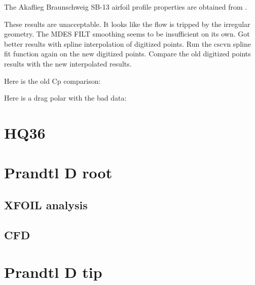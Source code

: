 \documentclass{article}
\begin{document}

The Akaflieg Braunschweig SB-13 airfoil profile properties are obtained from \cite{SB13Aerodynamics}.


These results are unacceptable.  It looks like the flow is tripped by the irregular geometry.  The MDES FILT smoothing seems to be insufficient on its own.  Got better results with spline interpolation of digitized points.
Run the cscvn spline fit function again on the new digitized points.  Compare the old digitized points results with the new interpolated results.


Here is the old Cp comparison:



Here is a drag polar with the bad data:


\section{HQ36}


\section{Prandtl D root}

\subsection{XFOIL analysis}

\subsection{CFD}

\section{Prandtl D tip}





\end{document}
